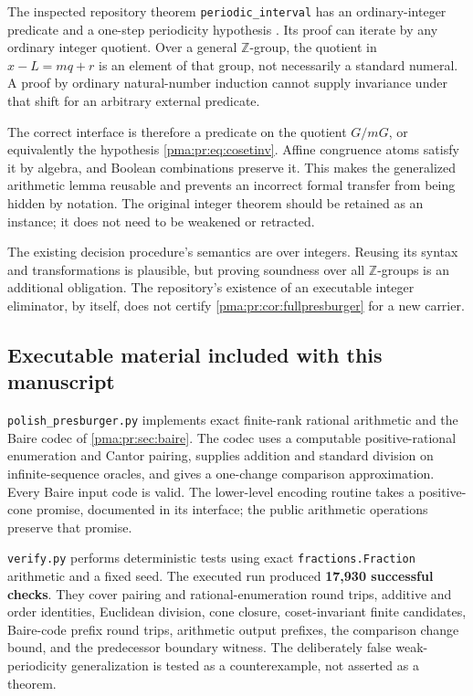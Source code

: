 \documentclass[11pt]{article}
\numberwithin{equation}{section}
\theoremstyle{definition}
\theoremstyle{remark}
\newcommand{\Z}{\mathbb Z}
\begin{document}
The inspected repository theorem \texttt{periodic\_interval} has an
ordinary-integer predicate and a one-step periodicity hypothesis
\cite{RepoCooper}. Its proof can iterate by any ordinary integer quotient.
Over a general $\Z$-group, the quotient in $x-L=mq+r$ is an element of
that group, not necessarily a standard numeral. A proof by ordinary
natural-number induction cannot supply invariance under that shift for
an arbitrary external predicate.

The correct interface is therefore a predicate on the quotient $G/mG$,
or equivalently the hypothesis \eqref{pma:pr:eq:cosetinv}. Affine congruence
atoms satisfy it by algebra, and Boolean combinations preserve it. This
makes the generalized arithmetic lemma reusable and prevents an
incorrect formal transfer from being hidden by notation. The original
integer theorem should be retained as an instance; it does not need to
be weakened or retracted.

The existing decision procedure's semantics are over integers. Reusing
its syntax and transformations is plausible, but proving soundness over
all $\Z$-groups is an additional obligation. The repository's existence
of an executable integer eliminator, by itself, does not certify
\cref{pma:pr:cor:fullpresburger} for a new carrier.

\subsection{Executable material included with this manuscript}

\texttt{polish\_presburger.py} implements exact finite-rank rational
arithmetic and the Baire codec of \cref{pma:pr:sec:baire}. The codec uses a
computable positive-rational enumeration and Cantor pairing, supplies
addition and standard division on infinite-sequence oracles, and gives
a one-change comparison approximation. Every Baire input code is valid.
The lower-level encoding routine takes a positive-cone promise, documented
in its interface; the public arithmetic operations preserve that promise.

\texttt{verify.py} performs deterministic tests using exact
\texttt{fractions.Fraction} arithmetic and a fixed seed. The executed
run produced \textbf{17,930 successful checks}. They cover pairing and
rational-enumeration round trips, additive and order identities,
Euclidean division, cone closure, coset-invariant finite candidates,
Baire-code prefix round trips, arithmetic output prefixes, the comparison
change bound, and the predecessor boundary witness. The deliberately
false weak-periodicity generalization is tested as a counterexample,
not asserted as a theorem.
\end{document}
